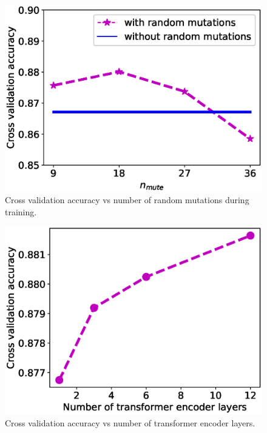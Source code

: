 \documentclass{article}
\begin{document}
\begin{minipage}{.5\linewidth}
\begin{figure}[H]
\center
\includegraphics[width=1\textwidth]{nmute_test.eps}
%
\caption{Cross validation accuracy vs number of random mutations during training.}
\label{fig:nmute}
\end{figure}
  \end{minipage}%
\hspace{0.5cm}
  \begin{minipage}{.5\linewidth}
\begin{figure}[H]
\center
\includegraphics[width=1\textwidth]{layers_acc.eps}
%
\caption{Cross validation accuracy vs number of transformer encoder layers.}
\label{fig:nlayer}
\end{figure}
  \end{minipage}
\end{document}
